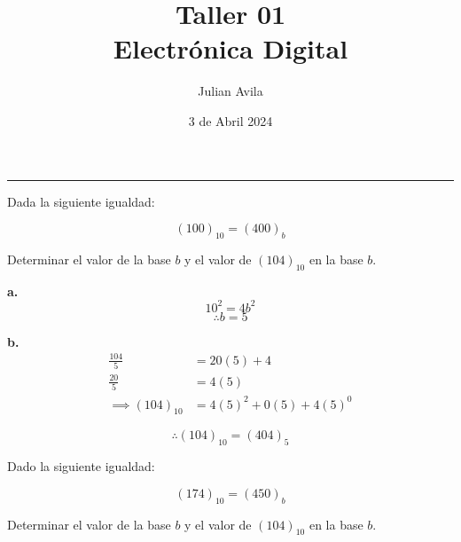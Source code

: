 \documentclass{article}
\title{\textbf{Taller 01\\ \small{Electrónica Digital}}}
\author[1]{Julian Avila}
\affil[1]{20212107030}
\date{3 de Abril 2024}
\newenvironment{problem}[2][Problema]{\begin{trivlist}
\item[\hskip \labelsep {\bfseries #1}\hskip \labelsep {\bfseries #2.}]}{\end{trivlist}}
\newenvironment{solution}[1][Solución]{\begin{trivlist}
\item[\hskip \labelsep {\bfseries #1:}]}{\end{trivlist}}
\begin{document}
\maketitle
\thispagestyle{fancy}
\hrule

\begin{problem}{1}
Dada la siguiente igualdad:

$$(100)_{10} = (400)_{b}$$

Determinar el valor de la base $b$ y el valor de $(104)_{10}$ en la base $b$.
\end{problem}

\begin{solution}
\textbf{a.}
\begin{equation*}
    10^{2} = 4b^2
\end{equation*}
\begin{equation*}
    \boxed{
        \therefore b = 5
    }
\end{equation*}

\textbf{b.}
\begin{align*}
    \frac{104}{5} & = 20(5) + 4 \\
    \frac{20}{5}  & = 4(5) \\
    \implies (104)_{10}    & = 4(5)^{2} + 0(5) + 4(5)^0
\end{align*}

\begin{equation*}
    \boxed{
        \therefore (104)_{10} = (404)_{5}
    }
\end{equation*}
\end{solution}


\begin{problem}{2}
Dado la siguiente igualdad:

$$ (174)_{10} = (450)_{b} $$

Determinar el valor de la base $b$ y el valor de $(104)_{10}$ en la base $b$.
\end{problem}
\end{document}
